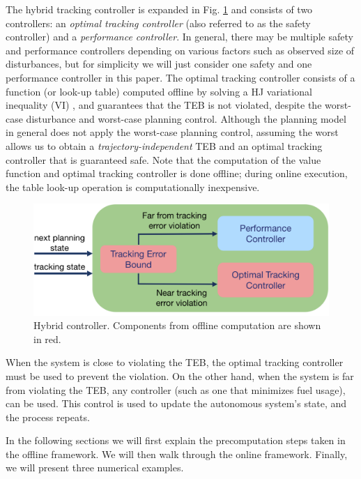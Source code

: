 The hybrid tracking controller is expanded in Fig. \ref{fig:hybrid_ctrl} and consists of two controllers: an \textit{optimal tracking controller }(also referred to as the safety controller) and a \textit{performance controller}.
In general, there may be multiple safety and performance controllers depending on various factors such as observed size of disturbances, but for simplicity we will just consider one safety and one performance controller in this paper. 
The optimal tracking controller consists of a function (or look-up table) computed offline by solving a HJ variational inequality (VI) \cite{Fisac15}, and guarantees that the TEB is not violated, despite the worst-case disturbance and worst-case planning control. 
Although the planning model in general does not apply the worst-case planning control, assuming the worst allows us to obtain a \textit{trajectory-independent} TEB and an optimal tracking controller that is guaranteed safe.
Note that the computation of the value function and optimal tracking controller is done offline; during online execution, the table look-up operation is computationally inexpensive. 
\begin{figure}[h!]
	\centering
	\includegraphics[width=\columnwidth]{fig/hybrid_controller_2}
	\caption{Hybrid controller. Components from offline computation are shown in red.}
	\label{fig:hybrid_ctrl}
\end{figure}

When the system is close to violating the TEB, the optimal tracking controller must be used to prevent the violation. 
On the other hand, when the system is far from violating the TEB, any controller (such as one that minimizes fuel usage), can be used. 
This control is used to update the autonomous system's state, and the process repeats.

In the following sections we will first explain the precomputation steps taken in the offline framework. 
We will then walk through the online framework.
Finally, we will present three numerical examples.

